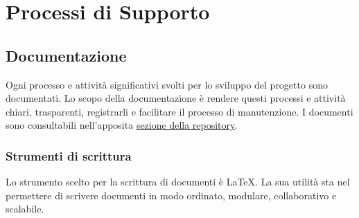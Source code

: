 \section{Processi di Supporto}
	\subsection{Documentazione}
		Ogni processo e attività significativi svolti per lo sviluppo del progetto sono documentati. Lo scopo della documentazione è rendere questi processi e attività chiari, trasparenti, registrarli e facilitare il processo di manutenzione. I documenti sono consultabili nell'apposita \href{https://github.com/8LabSolutions/Soldino}{\underline{sezione della repository}}. 
		\subsubsection{Strumenti di scrittura}
		Lo strumento scelto per la scrittura di documenti è \LaTeX. La sua utilità sta nel permettere di scrivere documenti in modo ordinato, modulare, collaborativo e scalabile.
